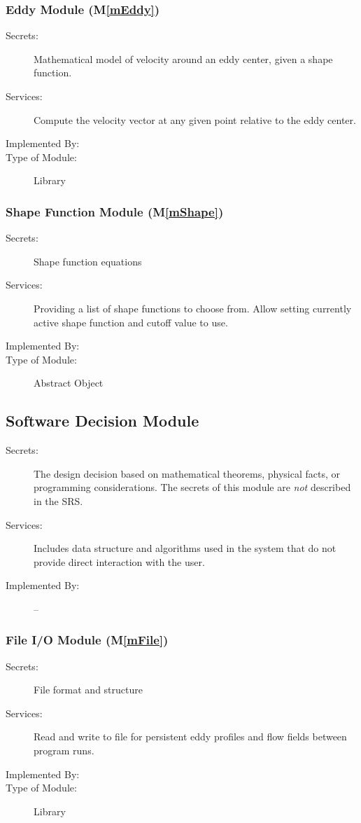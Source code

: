 \documentclass[12pt, titlepage]{article}
\newcommand{\mref}[1]{M\ref{#1}}
\begin{document}
\subsubsection{Eddy Module (\mref{mEddy})}
\begin{description}
\item[Secrets:]Mathematical model of velocity around an eddy center, given a shape function.
\item[Services:]Compute the velocity vector at any given point relative to the eddy center.
\item[Implemented By:] \progname{}
\item[Type of Module:] Library
\end{description}

\subsubsection{Shape Function Module (\mref{mShape})}
\begin{description}
\item[Secrets:]Shape function equations
\item[Services:]Providing a list of shape functions to choose from. Allow setting currently active shape function and cutoff value to use.
\item[Implemented By:] \progname{}
\item[Type of Module:] Abstract Object
\end{description}


\subsection{Software Decision Module}

\begin{description}
\item[Secrets:] The design decision based on mathematical theorems, physical
  facts, or programming considerations. The secrets of this module are
  \emph{not} described in the SRS.
\item[Services:] Includes data structure and algorithms used in the system that
  do not provide direct interaction with the user. 
\item[Implemented By:] --
\end{description}

\subsubsection{File I/O Module (\mref{mFile})}
\begin{description}
\item[Secrets:]File format and structure
\item[Services:]Read and write to file for persistent eddy profiles and flow fields between program runs.
\item[Implemented By:] \progname{}
\item[Type of Module:] Library
\end{description}
\end{document}
